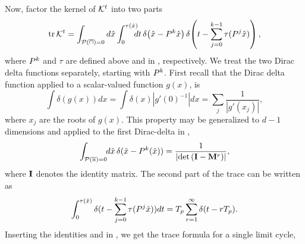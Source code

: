 %
Now, factor the kernel of ${\cal K}^t$  into two parts
%
\begin{equation}
\mbox{\rm tr}\, {\cal K}^t = \int_{\mathcal{P(\overline{u})}
=0}d\hat{x} \int_0^{\tau(\hat{x})}\!\!\!\!dt\,
   \delta\!\left (\hat{x}-P^{k}\hat{x}\right )
   \delta\!\left (t-\sum_{j=0}^{k-1}\tau(P^j\hat{x})\right ),
\label{eq:app:kerfac}
\end{equation}
%
where $P^k$ and $\tau$ are defined above and in
, respectively.  We treat the two Dirac delta
functions separately, starting with $P^k$. First recall that the
Dirac delta function applied to a scalar-valued function $g(x)$,
is
%
\[
\int \delta (g(x)) dx = \int \delta (x) |g'(0)^{-1}| dx =  \sum_j\frac{1}{|g'(x_j)|},
\]
%
where $x_j$ are the roots of $g(x)$. This property may be generalized
to $d\!-\!1$ dimensions and applied to the first Dirac-delta in
,
%
\begin{equation}
\int_{\mathcal{P}(\overline{u})=0}\!\!d\hat{x}\,\delta(\hat{x}-P^{k}(\hat{x}))
 = \frac{1}{|\mbox{\rm det}\, ({\bf\mathbf{I}}- {\bf\mathbf{M}}^r)|},
\label{eq:app:det0}
\end{equation}
%
where ${\bf\mathbf{I}}$ denotes the identity matrix.   The second part of the
trace can be written as %
%
\begin{equation}
\int_{0}^{\tau(\hat{x})}\delta (t-\sum_{j=0}^{k-1}\tau(P^j\hat{x}))d t
   ={T_{p}} \sum_{r=1}^\infty\delta (t-r{T_{p}}).
\label{eq:app:fac2lim}
\end{equation}
%
%
Inserting the  identities  and
 in , we get the trace
formula for a single limit cycle,
